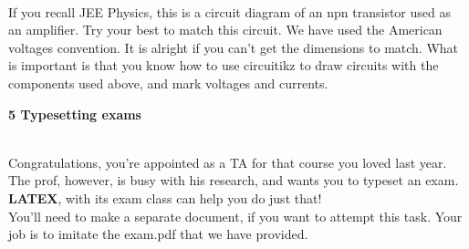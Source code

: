 \documentclass{knittingpattern}
\begin{document}
\\
\vspace{1cm}
If you recall JEE Physics, this is a circuit diagram of an npn transistor used as an amplifier. Try your best to match this
circuit. We have used the American voltages convention. It is alright if you can’t get the dimensions to match. What is
important is that you know how to use circuitikz to draw circuits with the components used above, and mark voltages and
currents.
\\
\begin{flushleft}
\Large{\textbf{5 Typesetting exams}}
\end{flushleft}
\\
Congratulations, you’re appointed as a TA for that course you loved last year. The prof, however, is busy with his research,
and wants you to typeset an exam. \textbf{LATEX}, with its exam class can help you do just that!\\

You’ll need to make a separate document, if you want to attempt this task. Your job is to imitate the exam.pdf that we
have provided.\\
\end{document}
